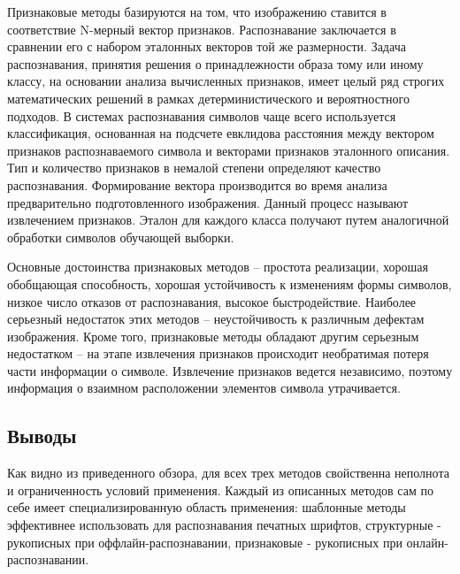 Признаковые методы базируются на том, что изображению ставится в
соответствие N-мерный вектор признаков. Распознавание заключается в сравнении его
с набором эталонных векторов той же размерности. Задача распознавания, принятия
решения о принадлежности образа тому или иному классу, на основании анализа
вычисленных признаков, имеет целый ряд строгих математических решений в рамках
детерминистического и вероятностного подходов. В системах распознавания
символов чаще всего используется классификация, основанная на подсчете евклидова
расстояния между вектором признаков распознаваемого символа и векторами
признаков эталонного описания. Тип и количество признаков в немалой степени
определяют качество распознавания. Формирование вектора производится во время
анализа предварительно подготовленного изображения. Данный процесс называют
извлечением признаков. Эталон для каждого класса получают путем аналогичной
обработки символов обучающей выборки.

Основные достоинства признаковых методов -- простота реализации, хорошая
обобщающая способность, хорошая устойчивость к изменениям формы символов,
низкое число отказов от распознавания, высокое быстродействие. Наиболее серьезный
недостаток этих методов -- неустойчивость к различным дефектам изображения. Кроме
того, признаковые методы обладают другим серьезным недостатком -- на этапе
извлечения признаков происходит необратимая потеря части информации о символе.
Извлечение признаков ведется независимо, поэтому информация о взаимном
расположении элементов символа утрачивается.

\subsection{Выводы}

Как видно из приведенного обзора, для всех трех методов свойственна
неполнота и ограниченность условий применения. Каждый из описанных методов сам
по себе имеет специализированную область применения: шаблонные методы
эффективнее использовать для распознавания печатных шрифтов, структурные -
рукописных при оффлайн-распознавании, признаковые - рукописных при онлайн-
распознавании.

